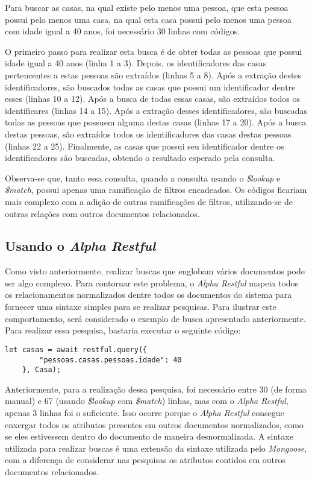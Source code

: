 Para buscar as casas, na qual existe pelo menos uma pessoa, que esta pessoa possui pelo menos uma casa, na qual esta casa possui pelo menos uma pessoa com idade igual a 40 anos, foi necessário 30 linhas com códigos.
    
O primeiro passo para realizar esta busca é de obter todas as pessoas que possui idade igual a 40 anos (linha 1 a 3). Depois, os identificadores das casas pertencentes a estas pessoas são extraídos (linhas 5 a 8). Após a extração destes identificadores, são buscados todas as casas que possui um identificador dentre esses (linhas 10 a 12). Após a busca de todas essas casas, são extraídos todos os identificares (linhas 14 a 15). Após a extração desses identificadores, são buscadas todas as pessoas que possuem alguma destas casas (linhas 17 a 20). Após a busca destas pessoas, são extraídos todos os identificadores das casas destas pessoas (linhas 22 a 25). Finalmente, as casas que possui seu identificador dentre os identificadores são buscadas, obtendo o resultado esperado pela consulta.
    
Observa-se que, tanto essa consulta, quando a consulta usando o \textit{\$lookup} e \textit{\$match}, possui apenas uma ramificação de filtros encadeados. Os códigos ficariam mais complexo com a adição de outras ramificações de filtros, utilizando-se de outras relações com outros documentos relacionados.

\subsection{Usando o \textit{Alpha Restful}}

Como visto anteriormente, realizar buscas que englobam vários documentos pode ser algo complexo. Para contornar este problema, o \textit{Alpha Restful} mapeia todos os relacionamentos normalizados dentre todos os documentos do sistema para fornecer uma sintaxe simples para se realizar pesquisas. Para ilustrar este comportamento, será considerado o exemplo de busca apresentado anteriormente. Para realizar essa pesquisa, bastaria executar o seguinte código:
    
\begin{lstlisting}[style=ES6, caption={Busca em Dados Normalizados com o \textit{Alpha Restful}}]
    let casas = await restful.query({
        "pessoas.casas.pessoas.idade": 40
    }, Casa);
\end{lstlisting}
    
Anteriormente, para a realização dessa pesquisa, foi necessário entre 30 (de forma manual) e 67 (usando \textit{\$lookup} com \textit{\$match}) linhas, mas com o \textit{Alpha Restful}, apenas 3 linhas foi o suficiente. Isso ocorre porque o \textit{Alpha Restful} consegue enxergar todos os atributos presentes em outros documentos normalizados, como se eles estivessem dentro do documento de maneira desnormalizada. A sintaxe utilizada para realizar buscas é uma extensão da sintaxe utilizada pelo \textit{Mongoose}, com a diferença de considerar nas pesquisas os atributos contidos em outros documentos relacionados.

